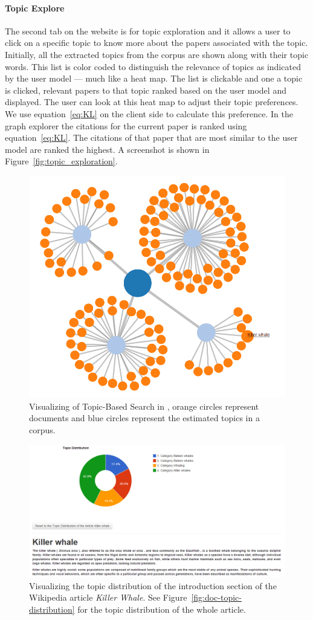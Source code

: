 \paragraph{Topic Explore} The second tab on the website is for topic exploration and it allows a user to click on a specific topic to know more about the papers associated with the topic.
Initially, all the extracted topics from the corpus are shown along with their topic words.
This list is color coded to distinguish the relevance of topics as indicated by the user model --- much like a heat map.
The list is clickable and one a topic is clicked, relevant papers to that topic ranked based on the user model and displayed.
The user can look at this heat map to adjust their topic preferences.
We use equation~\ref{eq:KL} on the client side to calculate this preference. 
In the graph explorer the citations for the current paper is ranked
using equation~\ref{eq:KL}. The citations of that paper that are most
similar to the user model are ranked the highest.
A screenshot is shown in Figure~\ref{fig:topic_exploration}.





\begin{figure}[htb]\centering 
\includegraphics[width=.5\textwidth]{images/topical_docs.png}
\caption{Visualizing of Topic-Based Search in \system, orange 
circles represent documents and blue circles represent the estimated 
topics in a corpus.}
\label{fig:topic-search-viz}
\end{figure}

\begin{figure}[htb]\centering 
\includegraphics[width=1\textwidth]{images/para_topic_distribution.png}
\caption{Visualizing the topic distribution of the introduction 
section of the Wikipedia article \textit{Killer Whale}. See Figure~\ref{fig:doc-topic-distribution} for the topic distribution of 
the whole article.}
\label{fig:doc-word-counts}
\end{figure}

